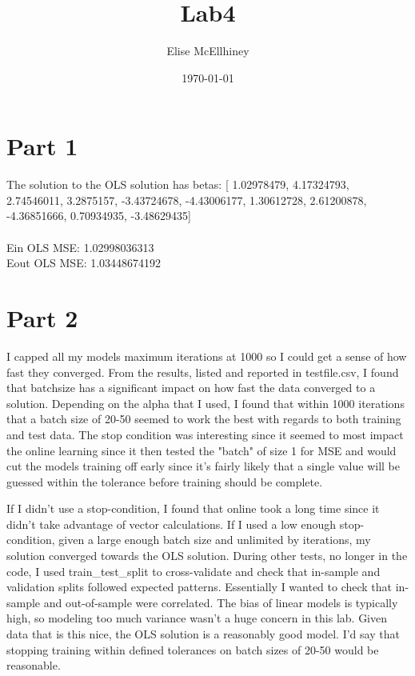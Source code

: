 \documentclass[10pt]{amsart}
\title{Lab4}
\author{Elise McEllhiney}
\date{\today}                                           %
\begin{document}
\maketitle
\section{Part 1}
The solution to the OLS solution has betas:
[ 1.02978479, 4.17324793, 2.74546011, 3.2875157, -3.43724678, -4.43006177, 1.30612728, 2.61200878, -4.36851666, 0.70934935, -3.48629435]
\\\\Ein OLS MSE:  1.02998036313
\\Eout OLS MSE: 1.03448674192

\section{Part 2}
I capped all my models maximum iterations at 1000 so I could get a sense of how fast they converged.  From the results, listed and reported in testfile.csv, I found that batchsize has a significant impact on how fast the data converged to a solution.  Depending on the alpha that I used, I found that within 1000 iterations that a batch size of 20-50 seemed to work the best with regards to both training and test data.  The stop condition was interesting since it seemed to most impact the online learning since it then tested the "batch" of size 1 for MSE and would cut the models training off early since it's fairly likely that a single value will be guessed within the tolerance before training should be complete.  

If I didn't use a stop-condition, I found that online took a long time since it didn't take advantage of vector calculations.  If I used a low enough stop-condition, given a large enough batch size and unlimited by iterations, my solution converged towards the OLS solution.  During other tests, no longer in the code, I used train\_test\_split to cross-validate and check that in-sample and validation splits followed expected patterns.  Essentially I wanted to check that in-sample and out-of-sample were correlated.  The bias of linear models is typically high, so modeling too much variance wasn't a huge concern in this lab.  Given data that is this nice, the OLS solution is a reasonably good model.  I'd say that stopping training within defined tolerances on batch sizes of 20-50 would be reasonable.
\end{document}
